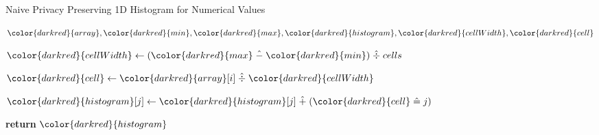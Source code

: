\begin{algorithm}[H]
\caption{Naive Privacy Preserving 1D Histogram for Numerical Values}\label{a:1d-simple-histogram-numerical}
\begin{algorithmic}[1]
\renewcommand{\algorithmicrequire}{\textbf{Private Vars:}}
\Require ${\color{darkred}{array}}, {\color{darkred}{min}}, {\color{darkred}{max}}, {\color{darkred}{histogram}}, {\color{darkred}{cellWidth}}, {\color{darkred}{cell}}$


    \State ${\color{darkred}{cellWidth}} \gets ({\color{darkred}{max}} \hminus {\color{darkred}{min}}) \hdiv cells $


        \State ${\color{darkred}{cell}} \gets {\color{darkred}{array}}[i] \hdiv {\color{darkred}{cellWidth}}$


            \State ${\color{darkred}{histogram}}[j] \gets {\color{darkred}{histogram}}[j] \hplus ({\color{darkred}{cell}} \heq j)$

        \EndFor
    \EndFor
    \State \textbf{return} {${\color{darkred}{histogram}}$}
\EndProcedure
\end{algorithmic}
\end{algorithm}
